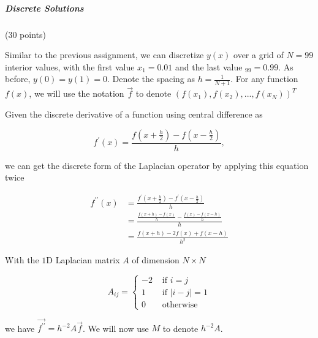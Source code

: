 \documentclass[10pt]{article}
\begin{document}
\subparagraph{Discrete Solutions}(30 points)

Similar to the previous assignment, 
we can discretize $y(x)$ over a grid of $N = 99$ interior values, with the first value $x_1 = 0.01$ and the last value $_{99} = 0.99$.
As before, $y(0) = y(1) = 0$. 
Denote the spacing as $h = \frac{1}{N+1}$.
For any function $f(x)$, we will use the notation $\vec{f}$ to denote $(f(x_1), f(x_2), ..., f(x_N))^T$

Given the discrete derivative of a function using central difference as

\begin{equation}
    f^{\prime}(x)=\frac{f\left(x+\frac{h}{2}\right)-f\left(x-\frac{h}{2}\right)}{h},
\end{equation}

we can get the discrete form of the Laplacian operator by applying this equation twice

\begin{equation}
\begin{aligned}
    f^{\prime\prime}(x)&=\frac{f^\prime\left(x+\frac{h}{2}\right)-f^\prime\left(x-\frac{h}{2}\right)}{h}\\
    &=\frac{
    \frac{f\left(x+h\right)-f\left(x\right)}{h}
    -\frac{f\left(x\right)-f\left(x-h\right)}{h}
    }{h}\\
    &=\frac{f\left(x+h\right)-2f\left(x\right)+f\left(x-h\right)}{h^2}
\end{aligned}
\end{equation}


With the $1 \mathrm{D}$ Laplacian matrix $A$ of dimension $N \times N$

\begin{equation}
A_{i j}=
    \left\{\begin{array}{ll}
        -2 & \text { if } i=j \\
        1 & \text { if }|i-j|=1 \\
        0 & \text { otherwise }
    \end{array}\right.
\end{equation}

we have $\overrightarrow{f^{\prime \prime}}=h^{-2} A \vec{f}$. 
We will now use $M$ to denote $h^{-2} A$.
\end{document}
